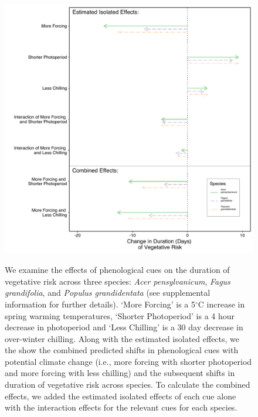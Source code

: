 \documentclass{article}\usepackage[]{graphicx}\usepackage[]{color}
\begin{document}
\begin{figure} [H] 
 \begin{center}
 \includegraphics[width=12cm, height=12cm]{..//figure/Exp_plotTPS.pdf} 
 \caption{We examine the effects of phenological cues on the duration of vegetative risk across three species: \textit{Acer pensylvanicum}, \textit{Fagus grandifolia}, and \textit{Populus grandidentata} (see supplemental information for further details). `More Forcing' is a 5$^{\circ}$C increase in spring warming temperatures, `Shorter Photoperiod' is a 4 hour decrease in photoperiod and `Less Chilling' is a 30 day decrease in over-winter chilling. Along with the estimated isolated effects, we the show the combined predicted shifts in phenological cues with potential climate change (i.e., more forcing with shorter photoperiod and more forcing with less chilling) and the subsequent shifts in duration of vegetative risk across species. To calculate the combined effects, we added the estimated isolated effects of each cue alone with the interaction effects for the relevant cues for each species. }\label{fig:dan} 
 \end{center}
 \end{figure}


\end{document}
